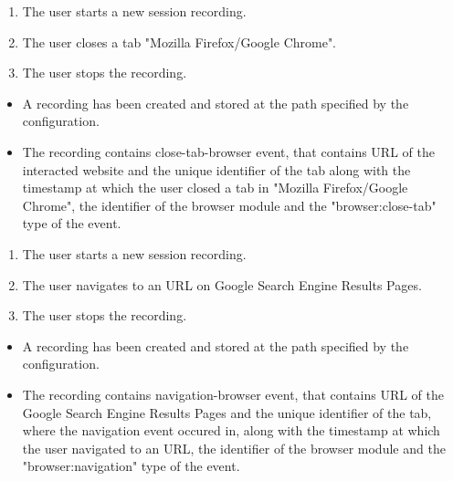 \begin{tests}
	{\begin{enumerate}
		\item The \gls{user} starts a new session recording.
		\item The \gls{user} closes a tab "Mozilla Firefox/Google Chrome".
		\item The \gls{user} stops the recording.
	\end{enumerate}}
	{\begin{itemize}
		\item A recording has been created and stored at the path specified by the configuration.
		\item The recording contains close-tab-browser event, that contains URL of the interacted website and the unique identifier of the tab along with the timestamp at which the user closed a tab in "Mozilla Firefox/Google Chrome", the identifier of the browser module and the "browser:close-tab" type of the event.
	\end{itemize}}
	
	{\begin{enumerate}
		\item The \gls{user} starts a new session recording.
		\item The \gls{user} navigates to an URL on Google Search Engine Results Pages.
		\item The \gls{user} stops the recording.
	\end{enumerate}}
	{\begin{itemize}
		\item A recording has been created and stored at the path specified by the configuration.
		\item The recording contains navigation-browser event, that contains URL of the Google Search Engine Results Pages and the unique identifier of the tab, where the navigation event occured in, along with the timestamp at which the user navigated to an URL, the identifier of the browser module and the "browser:navigation" type of the event.
	\end{itemize}}
	

\end{tests}
